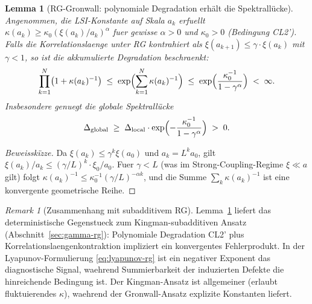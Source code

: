 \documentclass[12pt,a4paper]{article}
\theoremstyle{definition}
\theoremstyle{plain}
\newtheorem{lemma}[definition]{Lemma}
\theoremstyle{remark}
\newtheorem{remark}[definition]{Remark}
\begin{document}
\begin{lemma}[RG-Gronwall: polynomiale Degradation erh\"{a}lt die Spektrall\"{u}cke]\label{lem:rg-gronwall}
Angenommen, die LSI-Konstante auf Skala $a_k$ erfuellt $\kappa(a_k) \geq \kappa_0 (\xi(a_k)/a_k)^\alpha$ fuer gewisse $\alpha > 0$ und $\kappa_0 > 0$ (Bedingung CL2'). Falls die Korrelationslaenge unter RG kontrahiert als $\xi(a_{k+1}) \leq \gamma \cdot \xi(a_k)$ mit $\gamma < 1$, so ist die akkumulierte Degradation beschraenkt:
\begin{equation}\label{eq:rg-gronwall}
  \prod_{k=1}^{N} \bigl(1 + \kappa(a_k)^{-1}\bigr) \;\leq\; \exp\Bigl(\sum_{k=1}^{N} \kappa(a_k)^{-1}\Bigr) \;\leq\; \exp\Bigl(\frac{\kappa_0^{-1}}{1 - \gamma^\alpha}\Bigr) \;<\; \infty.
\end{equation}
Insbesondere genuegt die globale Spektrall\"{u}cke
\[
  \Delta_{\mathrm{global}} \;\geq\; \Delta_{\mathrm{local}} \cdot \exp\Bigl(-\frac{\kappa_0^{-1}}{1 - \gamma^\alpha}\Bigr) \;>\; 0.
\]
\end{lemma}

\begin{proof}[Beweissk\"{i}zze]
Da $\xi(a_k) \leq \gamma^k \xi(a_0)$ und $a_k = L^k a_0$, gilt $\xi(a_k)/a_k \leq (\gamma/L)^k \cdot \xi_0/a_0$. Fuer $\gamma < L$ (was im Strong-Coupling-Regime $\xi \ll a$ gilt) folgt $\kappa(a_k)^{-1} \leq \kappa_0^{-1} (\gamma/L)^{-\alpha k}$, und die Summe $\sum_k \kappa(a_k)^{-1}$ ist eine konvergente geometrische Reihe.
\end{proof}

\begin{remark}[Zusammenhang mit subadditivem RG]\label{rem:gronwall-kingman}
Lemma~\ref{lem:rg-gronwall} liefert das deterministische Gegenstueck zum Kingman-subadditiven Ansatz (Abschnitt~\ref{sec:gamma-rg}): Polynomiale Degradation CL2' plus Korrelationslaengenkontraktion impliziert ein konvergentes Fehlerprodukt. In der Lyapunov-Formulierung \eqref{eq:lyapunov-rg} ist ein negativer Exponent das diagnostische Signal, waehrend Summierbarkeit der induzierten Defekte die hinreichende Bedingung ist. Der Kingman-Ansatz ist allgemeiner (erlaubt fluktuierendes $\kappa$), waehrend der Gronwall-Ansatz explizite Konstanten liefert.
\end{remark}
\end{document}
